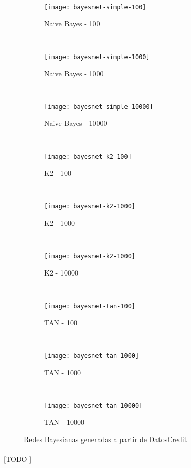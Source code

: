 \documentclass{article}
\begin{document}
			\begin{figure}[h]
				\centering
				\begin{subfigure}{.32\textwidth}
					\centering
					\texttt{[image: bayesnet-simple-100]}
					\caption{Naive Bayes - 100}
				\end{subfigure} \
				\begin{subfigure}{.32\textwidth}
					\centering
					\texttt{[image: bayesnet-simple-1000]}
					\caption{Naive Bayes - 1000}
				\end{subfigure} \
				\begin{subfigure}{.32\textwidth}
					\centering
					\texttt{[image: bayesnet-simple-10000]}
					\caption{Naive Bayes - 10000}
				\end{subfigure} \\
				\begin{subfigure}{.32\textwidth}
					\centering
					\texttt{[image: bayesnet-k2-100]}
					\caption{K2 - 100}
				\end{subfigure} \
				\begin{subfigure}{.32\textwidth}
					\centering
					\texttt{[image: bayesnet-k2-1000]}
					\caption{K2 - 1000}
				\end{subfigure} \
				\begin{subfigure}{.32\textwidth}
					\centering
					\texttt{[image: bayesnet-k2-1000]}
					\caption{K2 - 10000}
				\end{subfigure} \\
				\begin{subfigure}{.32\textwidth}
					\centering
					\texttt{[image: bayesnet-tan-100]}
					\caption{TAN - 100}
				\end{subfigure} \
				\begin{subfigure}{.32\textwidth}
					\centering
					\texttt{[image: bayesnet-tan-1000]}
					\caption{TAN - 1000}
				\end{subfigure} \
				\begin{subfigure}{.32\textwidth}
					\centering
					\texttt{[image: bayesnet-tan-10000]}
					\caption{TAN - 10000}
				\end{subfigure}
				\caption{Redes Bayesianas generadas a partir de DatosCredit}
				\label{fig:bayes_network}
			\end{figure}


			\paragraph{}
			[TODO ]
\end{document}

